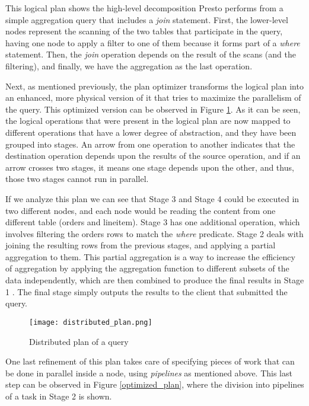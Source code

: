 \documentclass[conference]{IEEEtran}
\begin{document}
This logical plan shows the high-level decomposition Presto performs from a simple aggregation query that includes a \textit{join} statement. First, the lower-level nodes represent the scanning of the two tables that participate in the query, having one node to apply a filter to one of them because it forms part of a \textit{where} statement. Then, the \textit{join} operation depends on the result of the scans (and the filtering), and finally, we have the aggregation as the last operation.

Next, as mentioned previously, the plan optimizer transforms the logical plan into an enhanced, more physical version of it that tries to maximize the parallelism of the query. This optimized version can be observed in Figure \ref{distributed_plan}. As it can be seen, the logical operations that were present in the logical plan are now mapped to different operations that have a lower degree of abstraction, and they have been grouped into stages. An arrow from one operation to another indicates that the destination operation depends upon the results of the source operation, and if an arrow crosses two stages, it means one stage depends upon the other, and thus, those two stages cannot run in parallel.

If we analyze this plan we can see that Stage 3 and Stage 4 could be executed in two different nodes, and each node would be reading the content from one different table (orders and lineitem). Stage 3 has one additional operation, which involves filtering the orders rows to match the \textit{where} predicate. Stage 2 deals with joining the resulting rows from the previous stages, and applying a partial aggregation to them. This partial aggregation is a way to increase the efficiency of aggregation by applying the aggregation function to different subsets of the data independently, which are then combined to produce the final results in Stage 1 \cite{postgresql-2021}. The final stage simply outputs the results to the client that submitted the query.

\begin{figure}[htbp]
\centerline{\texttt{[image: distributed\_plan.png]}}
\caption{Distributed plan of a query \cite{sethi-2019}}
\label{distributed_plan}
\end{figure}

One last refinement of this plan takes care of specifying pieces of work that can be done in parallel inside a node, using \textit{pipelines} as mentioned above. This last step can be observed in Figure \ref{optimized_plan}, where the division into pipelines of a task in Stage 2 is shown.
\end{document}
